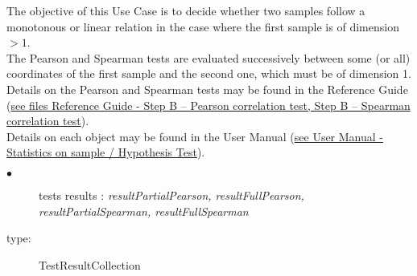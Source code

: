 \renewcommand{\filename}{docUC_InputWithData_PearsonSpearmanTests.tex}
\renewcommand{\filetitle}{UC : Particular manipulations of the Pearson and Spearman tests, when the first sample is of dimension superior to 1.}

\HeaderIIILevel



The objective of this Use Case is to decide whether two samples follow a monotonous or linear relation in the case where the first sample is of dimension $>1$.\\
The Pearson and Spearman tests are evaluated successively between some (or all) coordinates of the first sample and the second one, which must be of dimension 1.\\




Details on the Pearson and Spearman tests  may be found in the Reference Guide (\href{OpenTURNS_ReferenceGuide.pdf}{see files Reference Guide - Step B -- Pearson correlation test, Step B -- Spearman correlation test}).\\

Details on each object may be found in the User Manual  (\href{OpenTURNS_UserManual_TUI.pdf}{see User Manual - Statistics on sample /  Hypothesis Test}).\\




{
  \begin{description}
  \item[$\bullet$] tests results : {\itshape resultPartialPearson, resultFullPearson, resultPartialSpearman, resultFullSpearman}
  \item[type:] TestResultCollection
  \end{description}
}

